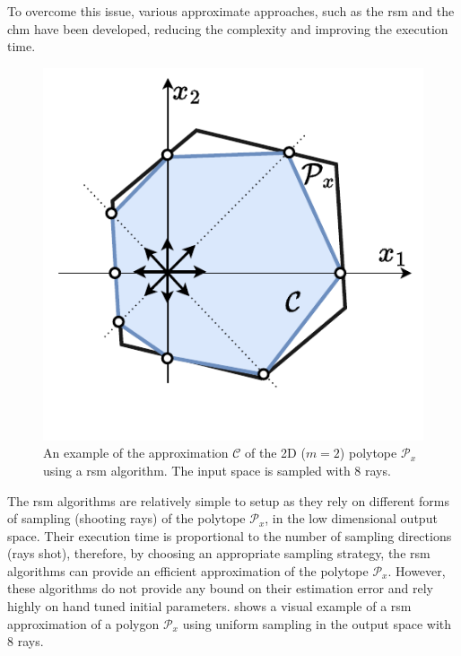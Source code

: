 To overcome this issue, various approximate approaches, such as the \gls{rsm} \cite{agarwal1993ray} and the \gls{chm} \cite{lassez1992quantifier} have been developed, reducing the complexity and improving the execution time. 

\begin{figure}
    \centering
    \includegraphics[width=\linewidth]{Papers/images/rsm.pdf}
    \caption{An example of the approximation $\mathcal{C}$ of the 2D ($m\!=\!2$) polytope $\mathcal{P}_x$ using a \gls{rsm} algorithm. The input space is sampled with 8 rays. }
    \label{fig:rsm}
\end{figure}
The \gls{rsm} algorithms are relatively simple to setup as they rely on different forms of sampling (shooting rays) of the polytope $\mathcal{P}_x$, in the low dimensional output space. Their execution time is proportional to the number of sampling directions (rays shot), therefore, by choosing an appropriate sampling strategy, the \gls{rsm} algorithms can provide an efficient approximation of the polytope $\mathcal{P}_x$. However, these algorithms do not provide any bound on their estimation error and rely highly on hand tuned initial parameters.  shows a visual example of a \gls{rsm} approximation of a polygon $\mathcal{P}_x$ using uniform sampling in the output space with 8 rays.

